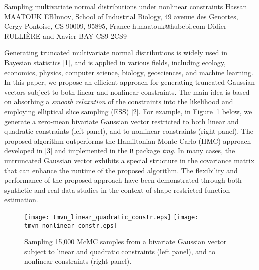 \begin{talk}
  {Sampling multivariate normal distributions under nonlinear constraints}%
  {Hassan MAATOUK}%
  {EBInnov, School of Industrial Biology, 49 avenue des Genottes,
Cergy-Pontoise, CS 90009, 95895, France}%
  {h.maatouk@hubebi.com}%
  {Didier RULLI\`ERE and Xavier BAY}%
{}{}{CS9-2}{CS9}

			

Generating truncated multivariate normal distributions is widely used in Bayesian statistics [1],  
and is applied in various fields, including ecology, economics, physics, computer science, biology, geosciences, and machine learning.
In this paper, we propose an efficient approach for generating truncated Gaussian vectors subject to both linear and nonlinear constraints.
The main idea is based on absorbing a \textit{smooth relaxation} of the constraints into the likelihood and employing elliptical slice sampling (ESS) [2]. 
For example, in Figure~\ref{fig:tmvn} below, we generate a zero-mean bivariate Gaussian vector restricted to both linear and quadratic constraints (left panel), and to nonlinear constraints (right panel). 
The proposed algorithm outperforms the Hamiltonian Monte Carlo (HMC) approach developed in [3] and implemented in the \texttt{R} package \textit{tmg}. In many cases, the untruncated Gaussian vector exhibits a special structure in the covariance matrix that can enhance the runtime of the proposed algorithm.
The flexibility and performance of the proposed approach have been demonstrated through both synthetic and real data studies in the context of shape-restricted function estimation.


\begin{figure}[ht]
\centering
\texttt{[image: tmvn\_linear\_quadratic\_constr.eps]}
\texttt{[image: tmvn\_nonlinear\_constr.eps]}
\caption{Sampling 15,000 McMC samples from a bivariate Gaussian vector subject to linear and quadratic constraints (left panel), and to nonlinear constraints (right panel).}
\label{fig:tmvn}
\end{figure}






\end{talk}
